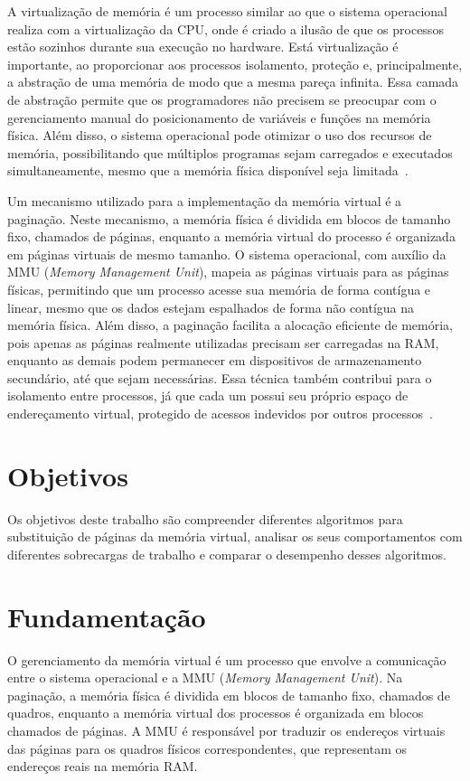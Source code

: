 \documentclass[
	12pt,				%
	oneside,   	        %
	a4paper,			%
	english,			%
	french,				%
	spanish,			%
	brazil,				%
	]{pacotes/abntex2}
\begin{document}
A virtualização de memória é um processo similar ao que o sistema operacional realiza com a virtualização da CPU, onde é criado a ilusão de que os processos estão sozinhos durante sua execução no hardware. Está virtualização é importante, ao proporcionar aos processos isolamento, proteção e, principalmente, a abstração de uma memória de modo que a mesma pareça infinita. Essa camada de abstração permite que os programadores não precisem se preocupar com o gerenciamento manual do posicionamento de variáveis e funções na memória física. Além disso, o sistema operacional pode otimizar o uso dos recursos de memória, possibilitando que múltiplos programas sejam carregados e executados simultaneamente, mesmo que a memória física disponível seja limitada~\cite{remzi2018}.

Um mecanismo utilizado para a implementação da memória virtual é a paginação. Neste mecanismo, a memória física é dividida em blocos de tamanho fixo, chamados de páginas, enquanto a memória virtual do processo é organizada em páginas virtuais de mesmo tamanho. O sistema operacional, com auxílio da MMU (\textit{Memory Management Unit}), mapeia as páginas virtuais para as páginas físicas, permitindo que um processo acesse sua memória de forma contígua e linear, mesmo que os dados estejam espalhados de forma não contígua na memória física. Além disso, a paginação facilita a alocação eficiente de memória, pois apenas as páginas realmente utilizadas precisam ser carregadas na RAM, enquanto as demais podem permanecer em dispositivos de armazenamento secundário, até que sejam necessárias. Essa técnica também contribui para o isolamento entre processos, já que cada um possui seu próprio espaço de endereçamento virtual, protegido de acessos indevidos por outros processos~\cite{tanenbaum2016}.

\section{Objetivos}
\label{sec:objetivos}
Os objetivos deste trabalho são compreender diferentes algoritmos para substituição de páginas da memória virtual, analisar os seus comportamentos com diferentes sobrecargas de trabalho e comparar o desempenho desses algoritmos.

\section{Fundamentação}
\label{sec:fundamentacao}
O gerenciamento da memória virtual é um processo que envolve a comunicação entre o sistema operacional e a MMU (\textit{Memory Management Unit}). Na paginação, a memória física é dividida em blocos de tamanho fixo, chamados de quadros, enquanto a memória virtual dos processos é organizada em blocos chamados de páginas. A MMU é responsável por traduzir os endereços virtuais das páginas para os quadros físicos correspondentes, que representam os endereços reais na memória RAM.
\end{document}
